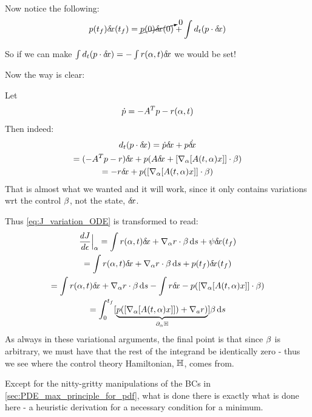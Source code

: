 \documentclass{article}
\begin{document}
Now notice the following:
$$p({ t_f }){ \delta\! x}({ t_f }) = \cancelto{0}{p(0){ \delta\! x}(0)} + \int d_t (p \cdot { \delta\! x})$$

So if we can make $\int d_t (p \cdot { \delta\! x}) = - \int r({\alpha},t) { \delta\! x}$ we would be set!

Now the way is clear:

Let 
$$ 
\dot{p} = -A^T p - r({\alpha},t)
$$
Then indeed:
\begin{multline}
d_t (p \cdot { \delta\! x}) = \dot{p} { \delta\! x} + p \dot{{ \delta\! x}}
\\
= (-A^T p - r){ \delta\! x} + p (A{ \delta\! x}+ [{ \nabla }_{\alpha} [ A(t,{\alpha})x]] \cdot{\beta})
\\
= -r{ \delta\! x} + p ([{ \nabla }_{\alpha} [ A(t,{\alpha})x]] \cdot{\beta})
\end{multline}
That is almost what we wanted and it will work, since it only contains
variations wrt the control ${\beta}$, not the state, ${ \delta\! x}$. 

Thus
\cref{eq:J_variation_ODE} is transformed to read:
\begin{multline}
\frac {dJ}{d{\epsilon}} \Big|_{{\alpha}} = 
\int r({\alpha},t) { \delta\! x} +  { \nabla }_{\alpha} r \cdot {\beta} \, \mathrm{d} s + \psi { \delta\! x}({ t_f })
\\
=
\int r({\alpha},t) { \delta\! x} +  { \nabla }_{\alpha} r \cdot {\beta} \, \mathrm{d} s + p({ t_f }) { \delta\! x}({ t_f })
\\
= \int r({\alpha},t) { \delta\! x} +  { \nabla }_{\alpha} r \cdot {\beta} \, \mathrm{d} s - \int r { \delta\! x} - p ([{ \nabla }_{\alpha} [
A(t,{\alpha})x]] \cdot{\beta})
\\
=
\int_0^{ t_f }  
[\underbrace{p ([{ \nabla }_{\alpha} [A(t,{\alpha})x]] ) + { \nabla }_a r)}_{{\partial}_{\alpha} { \mathbb{H}}} ] 
{\beta} \, \mathrm{d} s
\end{multline}
As always in these variational arguments, the final point is that since ${\beta}$ is
arbitrary, we must have that the rest of the integrand be identically zero -
thus we see where the control theory Hamiltonian, ${ \mathbb{H}}$, comes from.
 
Except for the nitty-gritty manipulations of the BCs in
\cref{sec:PDE_max_principle_for_pdf}, what is done there is exactly what is done
here - a heuristic derivation for a necessary condition for a minimum.




% 
\end{document}
